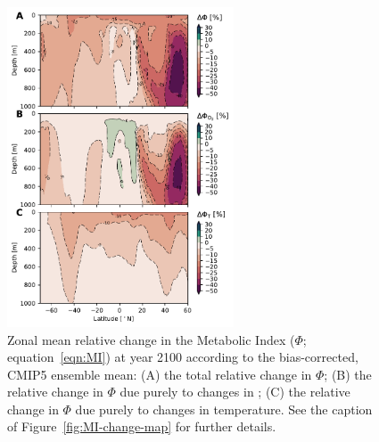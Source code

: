 \documentclass[draft,linenumbers]{report_chapter}
\begin{document}
\begin{figure}[p]
\centering
\includegraphics[width=0.6\textwidth]{metabolic-index-change-zonal.pdf}
\caption{Zonal mean relative change in the Metabolic Index ($\Phi$; equation~\ref{eqn:MI}) at year 2100 according to the bias-corrected, CMIP5 ensemble mean:
(A) the total relative change in $\Phi$; (B) the relative change in $\Phi$ due purely to changes in ; (C) the relative change in $\Phi$ due purely to changes in temperature.
See the caption of Figure~\ref{fig:MI-change-map} for further details.
}
\label{fig:MI-change-zonal}
\end{figure}
\end{document}
